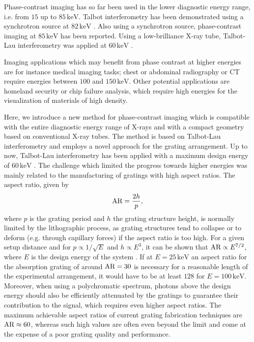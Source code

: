 \documentclass[aip,apl,amsmath,amssymb,floatfix,reprint,a4paper]{revtex4-1}
\newcommand{\unit}[1]{\ensuremath{\, \mathrm{#1}}}
\begin{document}
Phase-contrast imaging has so far been used in the lower diagnostic energy range, i.e. from $15$ up to $85 \unit{keV}$. Talbot interferometry has been demonstrated using a synchrotron source at $82 \unit{keV}$ \cite{Willner2013}. Also using a synchrotron source, phase-contrast imaging at $85 \unit{keV}$ has been reported. Using a low-brilliance X-ray tube, Talbot-Lau interferometry was applied at $60 \unit{keV}$ \cite{Donath2009}.

Imaging applications which may benefit from phase contrast at higher energies are for instance medical imaging tasks; chest or abdominal radiography or CT require energies between $100$ and $150 \unit{keV}$. Other potential applications are homeland security or chip failure analysis, which require high energies for the visualization of materials of high density.

Here, we introduce a new method for phase-contrast imaging which is compatible with the entire diagnostic energy range of X-rays and with a compact geometry based on conventional X-ray tubes. The method is based on Talbot-Lau interferometry \cite{Pfeiffer2006} and employs a novel approach for the grating arrangement. Up to now, Talbot-Lau interferometry has been applied with a maximum design energy of $60 \unit{keV}$ \cite{Donath2009}. The challenge which limited the progress towards higher energies was mainly related to the manufacturing of gratings with high aspect ratios. The aspect ratio, given by
\begin{equation}
 \textnormal{AR} = \frac{2h}{p},
\end{equation}
where $p$ is the grating period and $h$ the grating structure height, is normally limited by the lithographic process, as grating structures tend to collapse or to deform (e.g. through capillary forces) if the aspect ratio is too high. For a given setup distance and for $p \propto 1/\sqrt{E}$ and $h \propto E^3$, it can be shown that $\textnormal{AR} \propto E^{7/2}$, where $E$ is the design energy of the system \cite{Momose2003a}. If at $E=25 \unit{keV}$ an aspect ratio for the absorption grating of around $\textnormal{AR}=30$ is necessary for a reasonable length of the experimental arrangement, it would have to be at least $128$ for $E=100 \unit{keV}$. Moreover, when using a polychromatic spectrum, photons above the design energy should also be efficiently attenuated by the gratings to guarantee their contribution to the signal, which requires even higher aspect ratios. The maximum achievable aspect ratios of current grating fabrication techniques \cite{David2007,Kenntner2010} are $\textnormal{AR} \approx 60$, whereas such high values are often even beyond the limit and come at the expense of a poor grating quality and performance.
\end{document}
